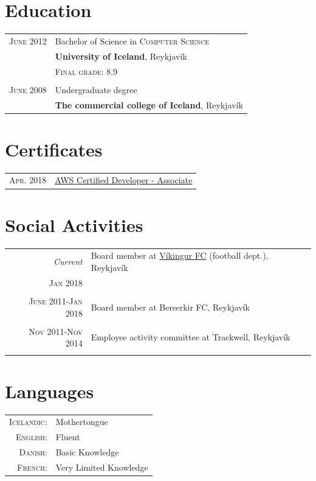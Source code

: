 \documentclass[a4paper,10pt]{article}
\begin{document}
\section{Education}
\begin{tabular}{rl}
 \textsc{June} 2012 & Bachelor of Science in \textsc{Computer Science}\\&\textbf{University of Iceland}, Reykjavík\\
&\normalsize \textsc{Final grade}: 8.9\\&\\

 \textsc{June} 2008 & Undergraduate degree\\&\textbf{The commercial college of Iceland}, Reykjavík
\end{tabular}

\section{Certificates}
\begin{tabular}{rl}
 \textsc{Apr.} 2018 & \href{https://aws.amazon.com/certification/certified-developer-associate/}{AWS Certified Developer - Associate}
\end{tabular}



\section{Social Activities}
\begin{tabular}{r|p{10cm}}

 \emph{Current} & Board member at \href{www.vikingur.is}{Víkingur FC} (football dept.), Reykjavík \\\textsc{Jan 2018}&\\\multicolumn{2}{c}{} \\

 \textsc{June 2011-Jan 2018} & Board member at Berserkir FC, Reykjavík \\\multicolumn{2}{c}{} \\

 \textsc{Nov 2011-Nov 2014} & Employee activity committee at Trackwell, Reykjavík \\\multicolumn{2}{c}{} \\

\end{tabular}
\section{Languages}
\begin{tabular}{rl}
 \textsc{Icelandic:}&Mothertongue\\
\textsc{English:}&Fluent\\
\textsc{Danish:}&Basic Knowledge\\
\textsc{French:}&Very Limited Knowledge\\
\end{tabular}
\end{document}
